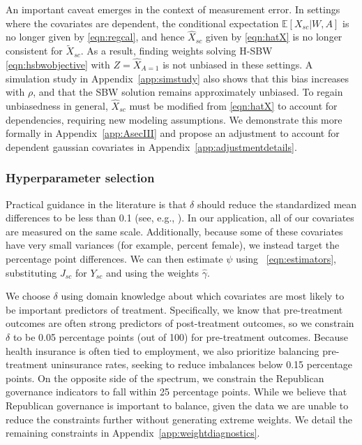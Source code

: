 \documentclass[aoas]{imsart}
\theoremstyle{plain}
\theoremstyle{remark}
\begin{document}
An important caveat emerges in the context of measurement error. In settings where the covariates are dependent, the conditional expectation $\mathbb{E}[X_{sc}|W,A]$ is no longer given by \eqref{eqn:regcal}, and hence $\hat{X}_{sc}$ given by \eqref{eqn:hatX} is no longer consistent for $\tilde{X}_{sc}$. As a result, finding weights solving H-SBW \eqref{eqn:hsbwobjective} with $Z = \hat{X}_{A=1}$ is not unbiased in these settings. A simulation study in Appendix~\ref{app:simstudy} also shows that this bias increases with $\rho$, and that the SBW solution remains approximately unbiased. To regain unbiasedness in general, $\hat{X}_{sc}$ must be modified from \eqref{eqn:hatX} to account for dependencies, requiring new modeling assumptions. We demonstrate this more formally in Appendix~\ref{app:AsecIII} and propose an adjustment to account for dependent gaussian covariates in Appendix~\ref{app:adjustmentdetails}.

\subsubsection{Hyperparameter selection} \label{ssec:delta}

Practical guidance in the literature is that $\delta$ should reduce the standardized mean differences to be less than 0.1 (see, e.g., \cite{zhang2019balance}). In our application, all of our covariates are measured on the same scale. Additionally, because some of these covariates have very small variances (for example, percent female), we instead target the percentage point differences. We can then estimate $\psi$ using ~\eqref{eqn:estimators}, substituting $J_{sc}$ for $Y_{sc}$ and using the weights $\hat{\gamma}$.

We choose $\delta$ using domain knowledge about which covariates are most likely to be important predictors of treatment. Specifically, we know that pre-treatment outcomes are often strong predictors of post-treatment outcomes, so we constrain $\delta$ to be 0.05 percentage points (out of 100) for pre-treatment outcomes. Because health insurance is often tied to employment, we also prioritize balancing pre-treatment uninsurance rates, seeking to reduce imbalances below 0.15 percentage points. On the opposite side of the spectrum, we constrain the Republican governance indicators to fall within 25 percentage points. While we believe that Republican governance is important to balance, given the data we are unable to reduce the constraints further without generating extreme weights. We detail the remaining constraints in Appendix~\ref{app:weightdiagnostics}. 
\end{document}
